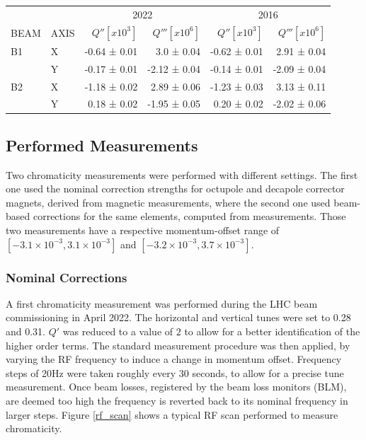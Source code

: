 \begin{table}[tbh]
    \centering
    \begin{tabular}{ll|rr|rr}
        \multicolumn{2}{c}{} & \multicolumn{2}{c}{2022}       &  \multicolumn{2}{c}{2016} \\
        BEAM & AXIS & $Q'' [x10^3]$ & $Q''' [x10^6]$ & $Q'' [x10^3]$ & $Q''' [x10^6]$\\
        \midrule
        B1 & X & -0.64 ± 0.01 &   3.0 ± 0.04   & -0.62 ± 0.01 &  2.91 ± 0.04 \\
           & Y & -0.17 ± 0.01 & -2.12 ± 0.04   & -0.14 ± 0.01 & -2.09 ± 0.04 \\
        \hline
        B2 & X & -1.18 ± 0.02 &  2.89 ± 0.06   & -1.23 ± 0.03 &  3.13 ± 0.11 \\
           & Y &  0.18 ± 0.02 & -1.95 ± 0.05   &  0.20 ± 0.02 & -2.02 ± 0.06 \\
    \end{tabular}
    \label{table:very_high_orders:bare_chroma_2016}
\end{table}



\subsection{Performed Measurements}


Two chromaticity measurements were performed with different settings. The first one used the 
nominal correction strengths for octupole and decapole corrector magnets, derived from magnetic measurements, where the second one used beam-based corrections for the same elements, computed from measurements. 
Those two measurements have a respective momentum-offset range of $[-3.1 \times 10^{-3}, 3.1 \times 10^{-3}]$ and $[-3.2 \times 10^{-3}, 3.7 \times 10^{-3}]$.

\subsubsection{Nominal Corrections}

A first chromaticity measurement was performed during the LHC beam commissioning in April 2022. The
horizontal and vertical tunes were set to 0.28 and 0.31. $Q'$ was reduced to a value of $2$ to allow
for a better identification of the higher order terms. The standard measurement procedure was then applied,    
by varying the RF frequency to induce a change in momentum offset. Frequency steps of 20Hz were taken roughly every
30 seconds, to allow for a precise tune measurement. Once beam losses, registered by the beam
loss monitors (BLM), are deemed too high the frequency is reverted back to its nominal frequency in
larger steps.
Figure \ref{rf_scan} shows a typical RF scan performed to measure chromaticity.

